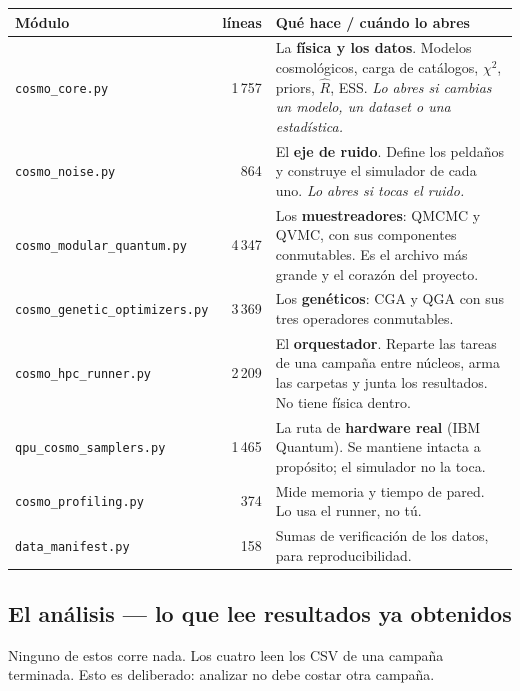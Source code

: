 \documentclass[11pt,a4paper]{article}
\newcommand{\M}[1]{\texttt{#1}}
\begin{document}
\begin{center}
\small
\begin{tabular}{@{}lrp{7.4cm}@{}}
\toprule
\textbf{Módulo} & \textbf{líneas} & \textbf{Qué hace / cuándo lo abres} \\
\midrule
\M{cosmo\_core.py} & 1\,757
  & La \textbf{física y los datos}. Modelos cosmológicos, carga de
    catálogos, $\chi^2$, priors, $\hat{R}$, ESS. \emph{Lo abres si cambias
    un modelo, un dataset o una estadística.} \\
\addlinespace
\M{cosmo\_noise.py} & 864
  & El \textbf{eje de ruido}. Define los peldaños y construye el simulador
    de cada uno. \emph{Lo abres si tocas el ruido.} \\
\addlinespace
\M{cosmo\_modular\_quantum.py} & 4\,347
  & Los \textbf{muestreadores}: QMCMC y QVMC, con sus componentes
    conmutables. Es el archivo más grande y el corazón del proyecto. \\
\addlinespace
\M{cosmo\_genetic\_optimizers.py} & 3\,369
  & Los \textbf{genéticos}: CGA y QGA con sus tres operadores
    conmutables. \\
\addlinespace
\M{cosmo\_hpc\_runner.py} & 2\,209
  & El \textbf{orquestador}. Reparte las tareas de una campaña entre
    núcleos, arma las carpetas y junta los resultados. No tiene física
    dentro. \\
\addlinespace
\M{qpu\_cosmo\_samplers.py} & 1\,465
  & La ruta de \textbf{hardware real} (IBM Quantum). Se mantiene intacta a
    propósito; el simulador no la toca. \\
\addlinespace
\M{cosmo\_profiling.py} & 374
  & Mide memoria y tiempo de pared. Lo usa el runner, no tú. \\
\addlinespace
\M{data\_manifest.py} & 158
  & Sumas de verificación de los datos, para reproducibilidad. \\
\bottomrule
\end{tabular}
\end{center}

\subsection{El análisis — lo que lee resultados ya obtenidos}

Ninguno de estos corre nada. Los cuatro leen los CSV de una campaña
terminada. Esto es deliberado: analizar no debe costar otra campaña.
\end{document}
